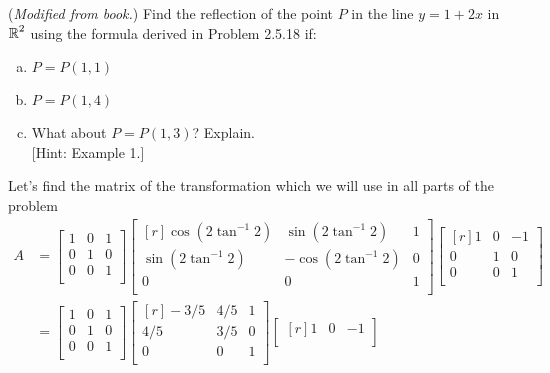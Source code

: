 \documentclass[../main.tex]{subfiles}
\begin{document}
(\emph{Modified from book.})
Find the reflection of the point $P$ in the line $y = 1 + 2x$ in $\operatorname{\mathbb{R}}^2$ using the formula derived in Problem 2.5.18 if:
\begin{enumerate}[a)]
	\item $P = P(1, 1)$
	\item $P = P(1, 4)$
	\item What about $P = P(1, 3)$? Explain. \\
	\hspace{0pt}[Hint: Example 1.]  %
\end{enumerate}

\solution
Let's find the matrix of the transformation which we will use in all parts of the problem
		\begin{align*}
			A
			&=
			\begin{bmatrix}
				1 & 0 & 1 \\
				0 & 1 & 0 \\
				0 & 0 & 1 \\
			\end{bmatrix}
			\begin{bmatrix*}[r]
				\cos(2\tan^{-1}2) &  \sin(2\tan^{-1}2) & 1 \\
				\sin(2\tan^{-1}2) & -\cos(2\tan^{-1}2) & 0 \\
				0 & 0 & 1 \\
			\end{bmatrix*}
			\begin{bmatrix*}[r]
				1 & 0 & -1 \\
				0 & 1 & 0 \\
				0 & 0 & 1 \\
			\end{bmatrix*}
			\\&=
			\begin{bmatrix}
				1 & 0 & 1 \\
				0 & 1 & 0 \\
				0 & 0 & 1 \\
			\end{bmatrix}
			\begin{bmatrix*}[r]
				-3/5 & 4/5 & 1 \\
				4/5 & 3/5 & 0 \\
				0 & 0 & 1 \\
			\end{bmatrix*}
			\begin{bmatrix*}[r]
				1 & 0 & -1 \\

\end{bmatrix*}
\end{align*}
\end{document}
